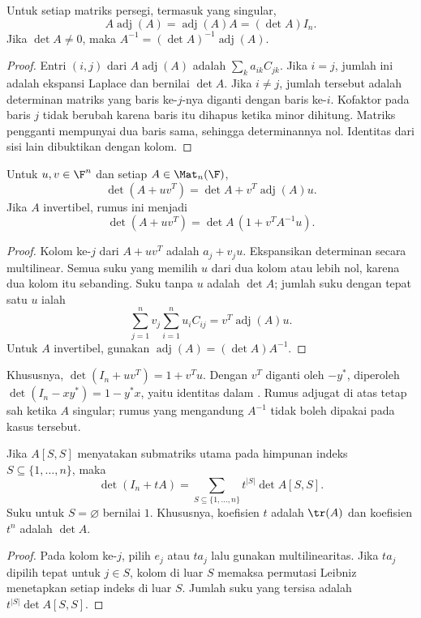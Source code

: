 \begin{thm}
      \label{det:identitas-adj}
      Untuk setiap matriks persegi, termasuk yang singular,
      \[
            A\operatorname{adj}(A)=\operatorname{adj}(A)A=(\det A)I_n.
      \]
      Jika $\det A\ne0$, maka $A^{-1}=(\det A)^{-1}\operatorname{adj}(A)$.
\end{thm}
\begin{proof}
      Entri $(i,j)$ dari $A\operatorname{adj}(A)$ adalah
      $\sum_k a_{ik}C_{jk}$. Jika $i=j$, jumlah ini adalah ekspansi Laplace
      dan bernilai $\det A$. Jika $i\ne j$, jumlah tersebut adalah
      determinan matriks yang baris ke-$j$-nya diganti dengan baris ke-$i$.
      Kofaktor pada baris $j$ tidak berubah karena baris itu dihapus ketika
      minor dihitung. Matriks pengganti mempunyai dua baris sama, sehingga
      determinannya nol. Identitas dari sisi lain dibuktikan dengan kolom.
\end{proof}

\begin{thm}
      \label{det:rankone}
      Untuk $u,v\in\F^n$ dan setiap $A\in\Mat_n(\F)$,
      \[
            \boxed{\det(A+uv^T)=\det A+v^T\operatorname{adj}(A)u.}
      \]
      Jika $A$ invertibel, rumus ini menjadi
      \[
            \det(A+uv^T)=\det A\,(1+v^TA^{-1}u).
      \]
\end{thm}
\begin{proof}
      Kolom ke-$j$ dari $A+uv^T$ adalah $a_j+v_ju$.
      Ekspansikan determinan secara multilinear. Semua suku yang memilih
      $u$ dari dua kolom atau lebih nol, karena dua kolom itu sebanding.
      Suku tanpa $u$ adalah $\det A$; jumlah suku dengan tepat satu $u$ ialah
      \[
            \sum_{j=1}^n v_j\sum_{i=1}^n u_iC_{ij}
            =v^T\operatorname{adj}(A)u.
      \]
      Untuk $A$ invertibel, gunakan
      $\operatorname{adj}(A)=(\det A)A^{-1}$.
\end{proof}

Khususnya, $\det(I_n+uv^T)=1+v^Tu$. Dengan $v^T$ diganti oleh
$-y^*$, diperoleh $\det(I_n-xy^*)=1-y^*x$, yaitu identitas dalam
\citet[Soal 2.41(a)]{zhang2009}. Rumus adjugat di atas tetap sah
ketika $A$ singular; rumus yang mengandung $A^{-1}$ tidak boleh
dipakai pada kasus tersebut.

\begin{prop}
      \label{det:principal}
      Jika $A[S,S]$ menyatakan submatriks utama pada himpunan indeks
      $S\subseteq\{1,\ldots,n\}$, maka
      \[
            \det(I_n+tA)=\sum_{S\subseteq\{1,\ldots,n\}}
            t^{|S|}\det A[S,S].
      \]
      Suku untuk $S=\varnothing$ bernilai $1$. Khususnya, koefisien $t$
      adalah $\tr(A)$ dan koefisien $t^n$ adalah $\det A$.
\end{prop}
\begin{proof}
      Pada kolom ke-$j$, pilih $e_j$ atau $ta_j$ lalu gunakan multilinearitas.
      Jika $ta_j$ dipilih tepat untuk $j\in S$, kolom di luar $S$ memaksa
      permutasi Leibniz menetapkan setiap indeks di luar $S$.
      Jumlah suku yang tersisa adalah $t^{|S|}\det A[S,S]$.
\end{proof}

